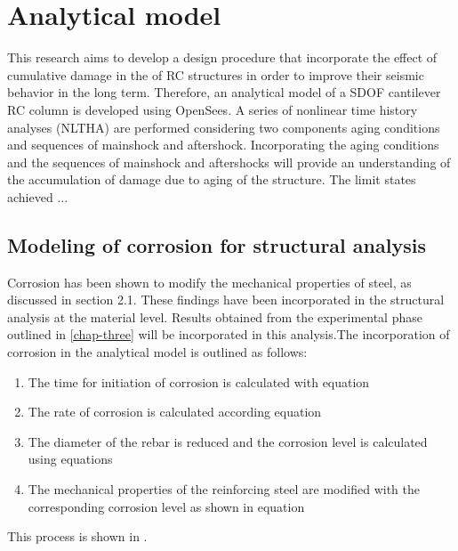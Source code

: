 \chapter{Analytical model}
\label{chap-four}
This research aims to develop a design procedure that incorporate the effect of cumulative damage in the of RC structures in order to improve their seismic behavior in the long term. Therefore, an analytical model of a SDOF cantilever RC column is developed using OpenSees. A series of nonlinear time history analyses (NLTHA) are performed considering two components aging conditions and sequences of mainshock and aftershock. Incorporating the aging conditions and the sequences of mainshock and aftershocks will provide an understanding of the accumulation of damage due to aging of the structure. The limit states achieved ...

\section{Modeling of corrosion for structural analysis}

Corrosion has been shown to modify the mechanical properties of steel, as discussed in section 2.1. These findings have been incorporated in the structural analysis at the material level. Results obtained from the experimental phase outlined in \ref{chap-three} will be incorporated in this analysis.The incorporation of corrosion in the analytical model is outlined as follows:
\begin{enumerate}
	\item The time for initiation of corrosion is calculated with equation  
	\item The rate of corrosion is calculated according equation 
	\item The diameter of the rebar is reduced and the corrosion level is calculated using equations   
	\item The mechanical properties of the reinforcing steel are modified with the corresponding corrosion level as shown in equation 
\end{enumerate}

This process is shown in .

